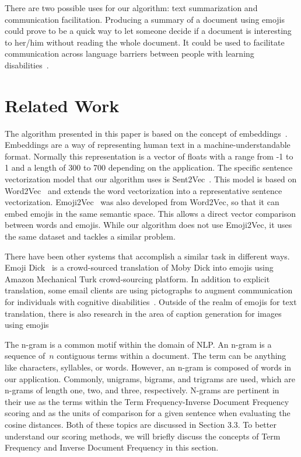 \documentclass{article}[10]
\begin{document}
There are two possible uses for our algorithm: text summarization and communication facilitation. Producing a summary of a document using emojis could prove to be a quick way to let someone decide if a document is interesting to her/him without reading the whole document. It could be used to facilitate communication across language barriers between people with learning disabilities~\cite{vandeghinste2017translating}.

\section{Related Work}

The algorithm presented in this paper is based on the concept of embeddings~\cite{WhatAreW70}. Embeddings are a way of representing human text in a machine-understandable format. Normally this representation is a vector of floats with a range from -1 to 1 and a length of 300 to 700 depending on the application. The specific sentence vectorization model that our algorithm uses is Sent2Vec~\cite{pg2017unsu}. This model is based on Word2Vec~\cite{mikolov2013efficient} and extends the word vectorization into a representative sentence vectorization. Emoji2Vec~\cite{Eisner_2016} was also developed from Word2Vec, so that it can embed emojis in the same semantic space. This allows a direct vector comparison between words and emojis. While our algorithm does not use Emoji2Vec, it uses the same dataset and tackles a similar problem.

There have been other systems that accomplish a similar task in different ways. Emoji Dick~\cite{radford2016telephone} is a crowd-sourced translation of Moby Dick into emojis using Amazon Mechanical Turk crowd-sourcing platform. In addition to explicit translation, some email clients are using pictographs to augment communication for individuals with cognitive disabilities~\cite{vandeghinste2017translating}. Outside of the realm of emojis for text translation, there is also research in the area of caption generation for images using emojis~\cite{mazoure-etal-2018-emojigan,cappallo2015image2emoji}

The n-gram is a common motif within the domain of NLP\@. An n-gram is a sequence of~\(n\) contiguous terms within a document. The term can be anything like characters, syllables, or words. However, an n-gram is composed of words in our application. Commonly, unigrams, bigrams, and trigrams are used, which are n-grams of length one, two, and three, respectively. N-grams are pertinent in their use as the terms within the Term Frequency-Inverse Document Frequency scoring and as the units of comparison for a given sentence when evaluating the cosine distances. Both of these topics are discussed in Section 3.3. To better understand our scoring methods, we will briefly discuss the concepts of Term Frequency and Inverse Document Frequency in this section.
\end{document}
